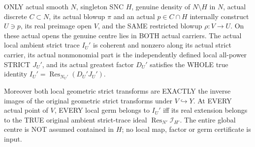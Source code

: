 \begin{theorem}
\label{hir:sharp-actual-incident-discrete-centre-restricted-member-factor}
\leanok
ONLY actual smooth $N$, singleton SNC $H$, genuine density of $N\setminus H$
in $N$, actual discrete $C\subset N$, its actual blowup $\pi$ and an
actual $p\in C\cap H$ internally construct $U\ni p$, its real preimage
open $V$, and the SAME restricted blowup $\rho:V\to U$. On these actual
opens the genuine centre lies in BOTH actual carriers. The actual local
ambient strict trace $I_U'$ is coherent and nonzero along its actual
strict carrier, its actual nonmonomial part is the independently defined
local all-power STRICT $J_U'$, and its actual greatest factor $D_U'$
satisfies the WHOLE true identity
$I_U'=\operatorname{Res}_{N_U'}(D_U'J_U')$.

Moreover both local geometric strict transforms are EXACTLY the inverse
images of the original geometric strict transforms under $V\hookrightarrow Y$.
At EVERY actual point of $V$, EVERY local germ belongs to $I_U'$ iff its
real extension belongs to the TRUE original ambient strict-trace ideal
$\operatorname{Res}_{N'}\mathcal I_{H'}$. The entire global centre is NOT
assumed contained in $H$; no local map, factor or germ certificate is input.
\end{theorem}
